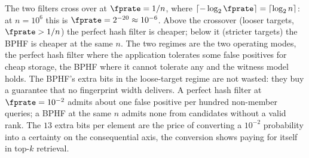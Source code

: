 The two filters cross over at $\fprate = 1/n$, where $\lceil -\log_2
\fprate \rceil = \lceil \log_2 n \rceil$: at $n = 10^6$ this is $\fprate =
2^{-20} \approx 10^{-6}$. Above the crossover (looser targets, $\fprate >
1/n$) the perfect hash filter is cheaper; below it (stricter targets)
the BPHF is cheaper at the same $n$. The two regimes are the two
operating modes, the perfect hash filter where the application tolerates
some false positives for cheap storage, the BPHF where it cannot
tolerate any and the witness model holds. The BPHF's extra bits in the
loose-target regime are not wasted: they buy a guarantee that no
fingerprint width delivers. A perfect hash filter at $\fprate =
10^{-2}$ admits about one false positive per hundred non-member queries;
a BPHF at the same $n$ admits none from candidates without a valid
rank. The $13$ extra
bits per element are the price of converting a $10^{-2}$ probability into
a certainty on the consequential axis, the conversion
 shows paying for itself in top-$k$ retrieval.
